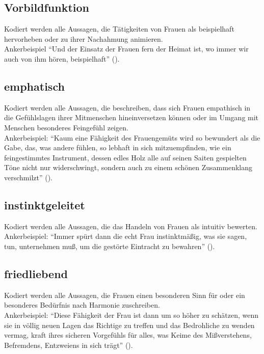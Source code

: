 \documentclass[12pt, titlepage=true, toc=bib]{scrartcl}
\begin{document}
\subsection*{Vorbildfunktion}

Kodiert werden alle Aussagen, die Tätigkeiten von Frauen als beispielhaft hervorheben oder zu ihrer Nachahmung animieren.\\
Ankerbeispiel "`Und der Einsatz der Frauen fern der Heimat ist, wo immer wir auch von ihm hören, beispielhaft"' (\cite[669]{maltzahn_deutsche_1936}).

\subsection*{emphatisch}

Kodiert werden alle Aussagen, die beschreiben, dass sich Frauen empathisch in die Gefühlslagen ihrer Mitmenschen hineinversetzen können oder im Umgang mit Menschen besonderes Feingefühl zeigen.\\
Ankerbeispiel: "`Kaum eine Fähigkeit des Frauengemüts wird so bewundert als die Gabe, das, was andere fühlen, so lebhaft in sich mitzuempfinden, wie ein feingestimmtes Instrument, dessen edles Holz alle auf seinen Saiten gespielten Töne nicht nur widerschwingt, sondern auch zu einem schönen Zusammenklang verschmilzt"' (\cite[36]{weinhandl_wie_1941}).

\subsection*{instinktgeleitet}

Kodiert werden alle Aussagen, die das Handeln von Frauen als intuitiv bewerten.\\
Ankerbeispiel: "`Immer spürt dann die echt Frau instinktmäßig, was sie sagen, tun, unternehmen muß, um die gestörte Eintracht zu bewahren"' (\cite[36]{weinhandl_wie_1941}).

\subsection*{friedliebend}

Kodiert werden alle Aussagen, die Frauen einen besonderen Sinn für oder ein besonderes Bedürfnis nach Harmonie zuschreiben.\\
Ankerbeispiel: "`Diese Fähigkeit der Frau ist dann um so höher zu schätzen, wenn sie in völlig neuen Lagen das Richtige zu treffen und das Bedrohliche zu wenden vermag, kraft ihres sicheren Vorgefühls für alles, was Keime des Mißverstehens, Befremdens, Entzweiens in sich trägt"' (\cite[36]{weinhandl_wie_1941}).
\end{document}
